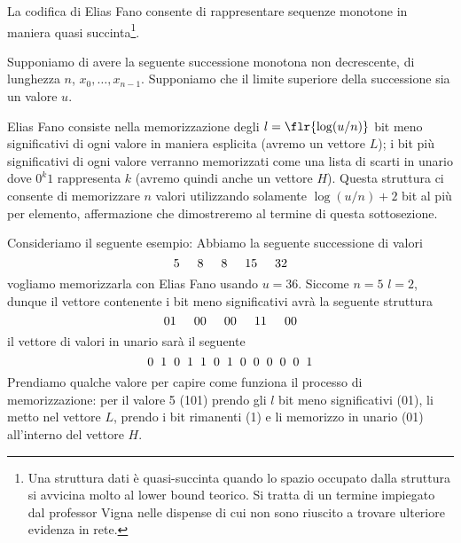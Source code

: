 La codifica di Elias Fano consente di rappresentare sequenze monotone in maniera quasi succinta\footnote{Una struttura dati è quasi-succinta quando lo spazio occupato dalla struttura si avvicina molto al lower bound teorico. Si tratta di un termine impiegato dal professor Vigna nelle dispense di cui non sono riuscito a trovare ulteriore evidenza in rete.}.

Supponiamo di avere la seguente successione monotona non decrescente, di lunghezza $n$, $x_0, \dots, x_{n - 1}$. Supponiamo che il limite superiore della successione sia un valore $u$.

Elias Fano consiste nella memorizzazione degli $l = \flr{\log(u / n)}$ bit meno significativi di ogni valore in maniera esplicita (avremo un vettore $L$); i bit più significativi di ogni valore verranno memorizzati come una lista di scarti in unario dove $0^k1$ rappresenta $k$ (avremo quindi anche un vettore $H$). Questa struttura ci consente di memorizzare $n$ valori utilizzando solamente $\log(u / n) + 2$ bit al più per elemento, affermazione che dimostreremo al termine di questa sottosezione.

Consideriamo il seguente esempio: Abbiamo la seguente successione di valori
\begin{equation*}
    \label{eq:sequenza-fano}
    5\hspace{5mm}8\hspace{5mm}8\hspace{5mm}15\hspace{5mm}32
\end{equation*}
vogliamo memorizzarla con Elias Fano usando $u = 36$. Siccome $n = 5$ $l = 2$, dunque il vettore contenente i bit meno significativi avrà la seguente struttura
\begin{equation*}
    01\hspace{5mm}00\hspace{5mm}00\hspace{5mm}11\hspace{5mm}00
\end{equation*}
il vettore di valori in unario sarà il seguente
\begin{equation*}
    0\hspace{2mm}1\hspace{2mm}0\hspace{2mm}1\hspace{2mm}1\hspace{2mm}0\hspace{2mm}1\hspace{2mm}0\hspace{2mm}0\hspace{2mm}0\hspace{2mm}0\hspace{2mm}0\hspace{2mm}1
\end{equation*}
Prendiamo qualche valore per capire come funziona il processo di memorizzazione:
per il valore 5 (101) prendo gli $l$ bit meno significativi (01), li metto nel vettore $L$, prendo i bit rimanenti (1) e li memorizzo in unario (01) all'interno del vettore $H$.

